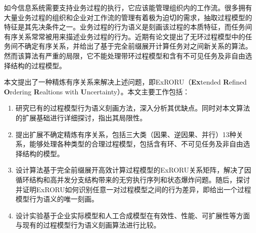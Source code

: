 \begin{cabstract}
如今信息系统需要支持业务过程的执行，它应该能管理组织内的工作流。很多拥有大量业务过程的组织和企业对工作流的管理有着极为迫切的需求，抽取过程模型的特征是其先决条件之一。业务过程的行为语义是刻画该过程的本质特征，而任务间有序关系常常被用来描述业务过程的行为。近期有论文提出了无环过程模型中的任务间不确定有序关系，并给出了基于完全前缀展开计算任务对之间新关系的算法。然而该算法有严重的局限，它不能处理带环过程模型和含有不可见任务及非自由选择结构的过程模型。

本文提出了一种精炼有序关系来解决上述问题，即ExRORU（\textbf{Ex}tended \textbf{R}efined \textbf{O}rdering \textbf{R}ealtions with \textbf{U}ncertainty）。本文主要工作包括：
\begin{enumerate}[1.]
  \item 研究已有的过程模型行为语义刻画方法，深入分析其优缺点。同时对本文算法的扩展基础进行详细探讨，指出其局限性。
  \item 提出扩展不确定精炼有序关系，包括三大类（因果、逆因果、并行）13种关系，能够处理各种类型的合理过程模型，包括含有环、不可见任务及非自由选择结构的模型。
  \item 设计算法基于完全前缀展开高效计算过程模型的ExRORU关系矩阵，解决了因循环结构和高并发分支结构带来的无穷执行序列和状态爆炸问题。随后，探讨并证明ExRORU如何识别任意一对过程模型之间的行为差异，即给出一个过程模型行为语义的唯一刻画。
  \item 设计实验基于企业实际模型和人工合成模型在有效性、性能、可扩展性等方面与现有的过程模型行为语义刻画算法进行比较。
\end{enumerate}
\end{cabstract}


